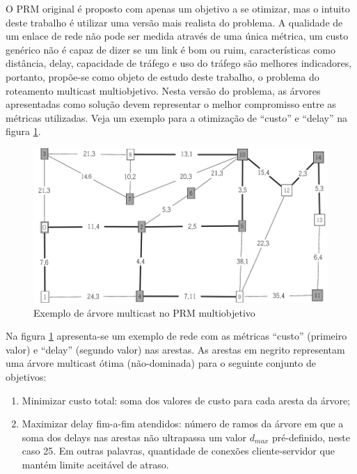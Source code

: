 O PRM original é proposto com apenas um objetivo a se otimizar, mas o intuito deste trabalho é utilizar uma versão mais realista do problema. A qualidade de um enlace de rede não pode ser medida através de uma única métrica, um custo genérico não é capaz de dizer se um link é bom ou ruim, características como distância, delay, capacidade de tráfego e uso do tráfego são melhores indicadores, portanto, propõe-se como objeto de estudo deste trabalho, o problema do roteamento multicast multiobjetivo. Nesta versão do problema, as árvores apresentadas como solução devem representar o melhor compromisso entre as métricas utilizadas. Veja um exemplo para a otimização de ``custo'' e ``delay'' na figura \ref{fig_prm_multi}.

\begin{figure}
	\label{fig_prm_multi}
	\caption{Exemplo de árvore multicast no PRM multiobjetivo}
	\centering
	\includegraphics[width=1\textwidth]{cap_problemas/figs/prm_multi}
\end{figure}

Na figura \ref{fig_prm_multi} apresenta-se um exemplo de rede com as métricas ``custo'' (primeiro valor) e ``delay'' (segundo valor) nas arestas. As arestas em negrito representam uma árvore multicast ótima (não-dominada) para o seguinte conjunto de objetivos:

\begin{enumerate} 
	\item Minimizar custo total: soma dos valores de custo para cada aresta da árvore;
	\item Maximizar delay fim-a-fim atendidos: número de ramos da árvore em que a soma dos delays nas arestas não ultrapassa um valor $d_{max}$ pré-definido, neste caso 25. Em outras palavras, quantidade de conexões cliente-servidor que mantém limite aceitável de atraso.
\end{enumerate}


